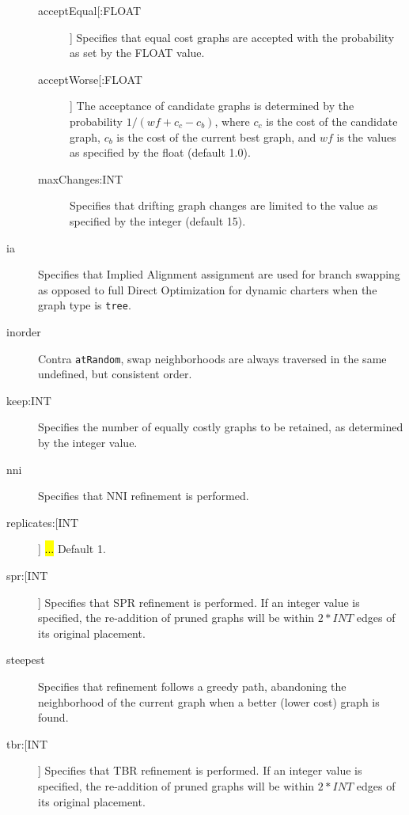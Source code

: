 \begin{description}
			\begin{description}
			
			\item[acceptEqual[:FLOAT]] Specifies that equal cost graphs are accepted with the
			probability as set by the FLOAT value. 
			
			\item[acceptWorse[:FLOAT]] The acceptance of candidate graphs is determined by the 
			probability $1/ (wf + c_c - c_b)$, where $c_c$ is the cost of the candidate graph, $c_b$ 
			is the cost of the current best graph, and $wf$ is the values as specified by the float 
			(default 1.0). 	
			
			\item[maxChanges:INT] Specifies that drifting graph changes are limited to the 
			value as specified by the integer (default 15).
			
			\end{description}
		
		\item[ia] Specifies that Implied Alignment \citep{Wheeler2003} assignment are used for 
		branch swapping as opposed to full Direct Optimization for dynamic charters when the 
		graph type is \texttt{tree}.
		
		\item[inorder] Contra \texttt{atRandom}, swap neighborhoods are always traversed 
		in the same undefined, but consistent order.
		
		\item[keep:INT] Specifies the number of equally costly graphs to be retained, as
		determined by the integer value.
		
		\item[nni] Specifies that NNI refinement \citep{CaminandSokal1965, Robinson1971} 
		is performed.
		
		\item[replicates:[INT]] \hl{...} Default 1.
		
		\item[spr:[INT]] Specifies that SPR refinement \citep{Dayhoff1969} is performed. If an 
		integer value is specified, the re-addition of pruned graphs will be within $2 * INT$ 
		edges of its original placement.
		
		\item[steepest] Specifies that refinement follows a greedy path, abandoning the 
		neighborhood of the current graph when a better (lower cost) graph is found.  		
		
		\item[tbr:[INT]] Specifies that TBR refinement \citep{Farris1988, swofford1990a} 
		is performed. If an integer value is specified, the re-addition of pruned graphs 
		will be within $2 * INT$ edges of its original placement.
		\end{description}	
		
